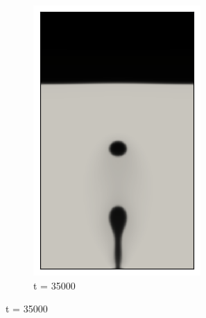\begin{figure}[H]
\begin{subfigure}{0.25\textwidth}
		\includegraphics[width=\linewidth]{figs/cap4/bb_760_d35}
		\caption{t = 35000}
		\label{fig:6}
	\end{subfigure}
	

\end{figure}
